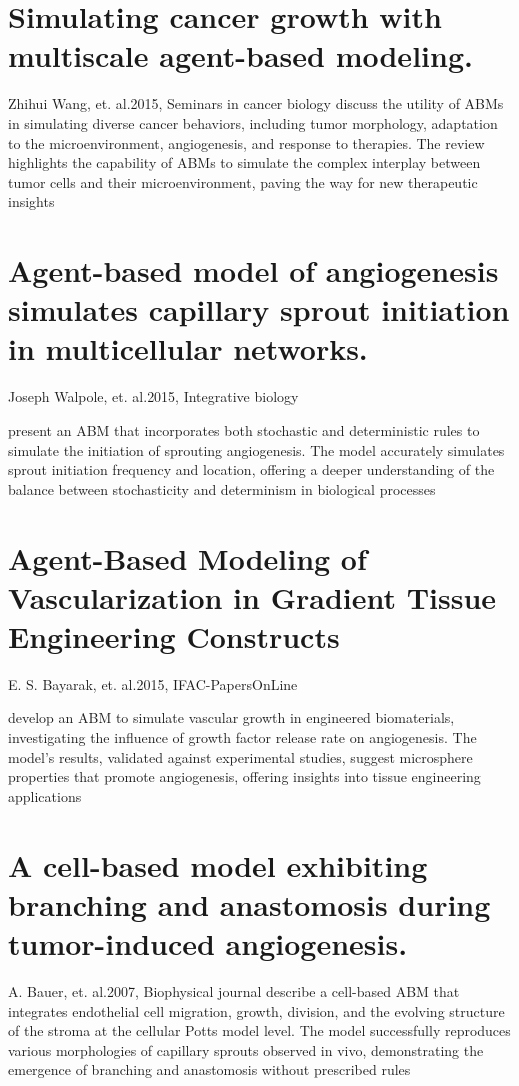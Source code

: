 \section{Simulating cancer growth with multiscale agent-based modeling.}{Zhihui Wang, et. al.}{2015, Seminars in cancer biology}
discuss the utility of ABMs in simulating diverse cancer behaviors, including tumor morphology, adaptation to the microenvironment, angiogenesis, and response to therapies. The review highlights the capability of ABMs to simulate the complex interplay between tumor cells and their microenvironment, paving the way for new therapeutic insights \cite{Wang2015}

\section{Agent-based model of angiogenesis simulates capillary sprout initiation in multicellular networks.}{Joseph Walpole, et. al.}{2015, Integrative biology}

present an ABM that incorporates both stochastic and deterministic rules to simulate the initiation of sprouting angiogenesis. The model accurately simulates sprout initiation frequency and location, offering a deeper understanding of the balance between stochasticity and determinism in biological processes \cite{Walpole2015}


\section{Agent-Based Modeling of Vascularization in Gradient Tissue Engineering Constructs}{E. S. Bayarak, et. al.}{2015, IFAC-PapersOnLine}

develop an ABM to simulate vascular growth in engineered biomaterials, investigating the influence of growth factor release rate on angiogenesis. The model's results, validated against experimental studies, suggest microsphere properties that promote angiogenesis, offering insights into tissue engineering applications \cite{Bayrak2015}

\section{A cell-based model exhibiting branching and anastomosis during tumor-induced angiogenesis.}{A. Bauer, et. al.}{2007, Biophysical journal}
describe a cell-based ABM that integrates endothelial cell migration, growth, division, and the evolving structure of the stroma at the cellular Potts model level. The model successfully reproduces various morphologies of capillary sprouts observed in vivo, demonstrating the emergence of branching and anastomosis without prescribed rules \cite{Bauer2007a}


